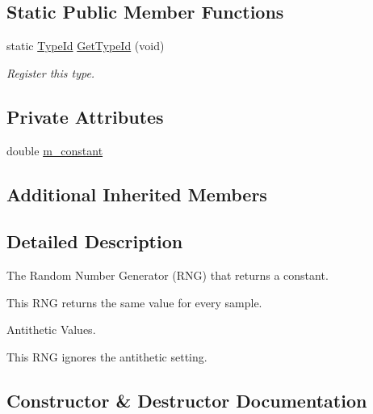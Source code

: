 \subsection*{Static Public Member Functions}
\begin{DoxyCompactItemize}
\item 
static \hyperlink{classns3_1_1TypeId}{Type\+Id} \hyperlink{classns3_1_1ConstantRandomVariable_aabbc24264cadb6e2103bd57964861b22}{Get\+Type\+Id} (void)
\begin{DoxyCompactList}\small\item\em Register this type. \end{DoxyCompactList}\end{DoxyCompactItemize}
\subsection*{Private Attributes}
\begin{DoxyCompactItemize}
\item 
double \hyperlink{classns3_1_1ConstantRandomVariable_a88375ad059af903c5e7fde63b7910dae}{m\+\_\+constant}
\end{DoxyCompactItemize}
\subsection*{Additional Inherited Members}


\subsection{Detailed Description}
The Random Number Generator (R\+NG) that returns a constant. 

This R\+NG returns the same value for every sample.

\begin{DoxyParagraph}{Antithetic Values.}

\end{DoxyParagraph}
This R\+NG ignores the antithetic setting. 

\subsection{Constructor \& Destructor Documentation}

